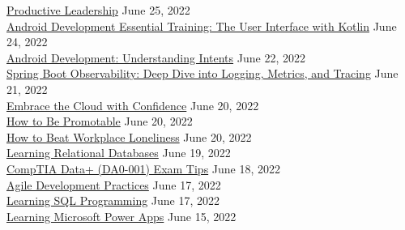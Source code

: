 \documentclass[10pt]{res} %
\begin{document}
\begin{resume}
\href{https://www.linkedin.com/learning/certificates/1c5f2b0b37e350fd908529f0fadfec1833bdf018f82594cbe1814d7d2cf4290c}{\color{blue}Productive Leadership} \hfill June 25, 2022 \\
\href{https://www.linkedin.com/learning/certificates/2416d18609fa8cabe42a89cdaac655ab02ca9b47b8f8d4a57636f47b847ec0b3}{\color{blue}Android Development Essential Training: The User Interface with Kotlin} \hfill June 24, 2022 \\
\href{https://www.linkedin.com/learning/certificates/71b880550f09a6b6b655646d38848fb7b875aefcd5de013872ae4d4c24218b7e}{\color{blue}Android Development: Understanding Intents} \hfill June 22, 2022 \\
\href{https://www.linkedin.com/learning/certificates/40ad9a9d767c971c576a8a6a412a34bbfdc232fd2cc28f0c6815c0de2af8df81}{\color{blue}Spring Boot Observability: Deep Dive into Logging, Metrics, and Tracing} \hfill June 21, 2022 \\
\href{https://www.linkedin.com/learning/certificates/56f945224cc2dbbfda7496eeaabb2f7ca4e8c17ce21d4ea4a5fb2afe16a79b5f}{\color{blue}Embrace the Cloud with Confidence} \hfill June 20, 2022 \\
\href{https://www.linkedin.com/learning/certificates/a5321564ca97bb4ea6d6b1aa541184f8290c165e22b58c4b70c88973592df54f}{\color{blue}How to Be Promotable} \hfill June 20, 2022 \\
\href{https://www.linkedin.com/learning/certificates/a2801dc032156ba4a4d874abded7adc862d5b78882528e4f842f06427f7773fc}{\color{blue}How to Beat Workplace Loneliness} \hfill June 20, 2022 \\
\href{https://www.linkedin.com/learning/certificates/b45b42a974cb6868d341d0cf085b9b1fd27b1b3af0ec73effb09cb160a6dbe9b}{\color{blue}Learning Relational Databases} \hfill June 19, 2022 \\
\href{https://www.linkedin.com/learning/certificates/30de0ed2c164a9aad33c5c4a9c9c0f5ce7bcb77511bf27231d72be7c8598ce1c}{\color{blue}CompTIA Data+ (DA0-001) Exam Tips} \hfill June 18, 2022 \\
\href{https://www.linkedin.com/learning/certificates/909629c40b01d67ce71b88797ad283a65c86068a0b401921818a79159d01b326}{\color{blue}Agile Development Practices} \hfill June 17, 2022 \\
\href{https://www.linkedin.com/learning/certificates/eea770815f4b22789d1d72028c8c5f6b8b8d5fd69649452986705c737e80cfae}{\color{blue}Learning SQL Programming} \hfill June 17, 2022 \\
\href{https://www.linkedin.com/learning/certificates/183dabf1c7d2cf0a642f243991079eb911575ed137d37b1c7c3c68b7f23b3ec4}{\color{blue}Learning Microsoft Power Apps} \hfill June 15, 2022 \\

\end{resume}
\end{document}
